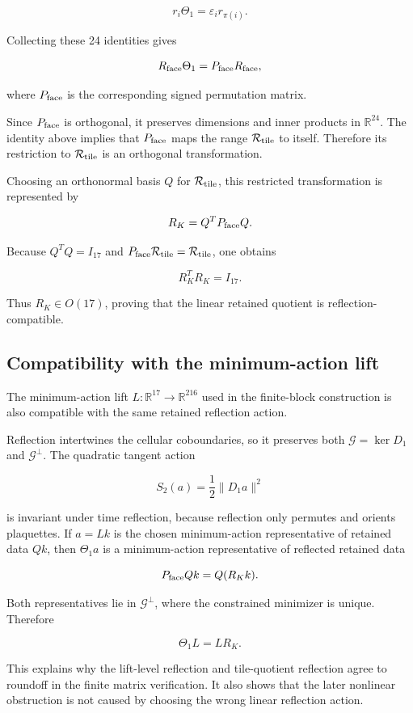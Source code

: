 \documentclass[10pt]{article}
\begin{document}
\[
r_i\Theta_1=\varepsilon_i r_{\pi(i)}.
\]

Collecting these 24 identities gives

\[
R_{\rm face}\Theta_1=P_{\rm face}R_{\rm face},
\]

where \(P_{\rm face}\) is the corresponding signed permutation matrix.

Since \(P_{\rm face}\) is orthogonal, it preserves dimensions and inner products in \(\mathbb R^{24}\).  The identity above implies that \(P_{\rm face}\) maps the range \(\mathcal R_{\rm tile}\) to itself.  Therefore its restriction to \(\mathcal R_{\rm tile}\) is an orthogonal transformation.

Choosing an orthonormal basis \(Q\) for \(\mathcal R_{\rm tile}\), this restricted transformation is represented by

\[
R_K=Q^TP_{\rm face}Q.
\]

Because \(Q^TQ=I_{17}\) and \(P_{\rm face}\mathcal R_{\rm tile}=\mathcal R_{\rm tile}\), one obtains

\[
R_K^TR_K=I_{17}.
\]

Thus \(R_K\in O(17)\), proving that the linear retained quotient is reflection-compatible.

\subsection{Compatibility with the minimum-action lift}

The minimum-action lift \(L:\mathbb R^{17}\to\mathbb R^{216}\) used in the finite-block construction is also compatible with the same retained reflection action.

Reflection intertwines the cellular coboundaries, so it preserves both \(\mathcal G=\ker D_1\) and \(\mathcal G^\perp\).  The quadratic tangent action

\[
S_2(a)=\frac12\|D_1a\|^2
\]

is invariant under time reflection, because reflection only permutes and orients plaquettes.  If \(a=Lk\) is the chosen minimum-action representative of retained data \(Qk\), then \(\Theta_1a\) is a minimum-action representative of reflected retained data

\[
P_{\rm face}Qk=Q(R_Kk).
\]

Both representatives lie in \(\mathcal G^\perp\), where the constrained minimizer is unique.  Therefore

\[
\boxed{
\Theta_1L=LR_K.
}
\]

This explains why the lift-level reflection and tile-quotient reflection agree to roundoff in the finite matrix verification.  It also shows that the later nonlinear obstruction is not caused by choosing the wrong linear reflection action.
\end{document}
